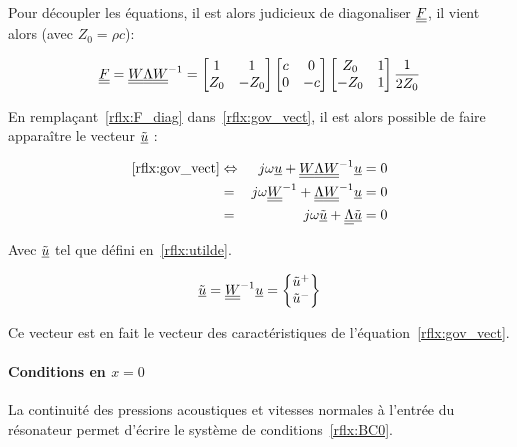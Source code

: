 Pour découpler les équations, il est alors judicieux de diagonaliser $\underline{\underline{F}}$, il vient alors (avec $Z_0= \rho c$):

\begin{equation}
	\underline{\underline{F}} = \underline{\underline{W}}\underline{\underline{\Lambda}}\underline{\underline{W}}^{-1} =
	\begin{bmatrix}
		1 & 1\\
		Z_0 & -Z_0
	\end{bmatrix}
	\begin{bmatrix}
		c & 0\\
		0 & -c
	\end{bmatrix}
	\begin{bmatrix}
		Z_0 & 1\\
		-Z_0 &  1
	\end{bmatrix}\frac{1}{2Z_0} \label{rflx:F_diag}
\end{equation}

En remplaçant~\eqref{rflx:F_diag} dans~\eqref{rflx:gov_vect}, il est alors possible de faire apparaître le vecteur
$\tilde{\underline{u}}$ :

\begin{eqnarray}
	\eqref{rflx:gov_vect} & \Leftrightarrow & j\omega \underline{u} + \underline{\underline{W}}\underline{\underline{\Lambda}}\underline{\underline{W}}^{-1}\underline{u} = 0\notag\\
									    & = & j\omega\underline{\underline{W}}^{-1} + \underline{\underline{\Lambda}}\underline{\underline{W}}^{-1}\underline{u} = 0\notag\\
										& = & j\omega\tilde{\underline{u}} + \underline{\underline{\Lambda}}\tilde{\underline{u}} = 0\label{rflx:gov_utilde}
\end{eqnarray}

Avec $\tilde{\underline{u}}$ tel que défini en~\eqref{rflx:utilde}.

\begin{equation}
	\tilde{\underline{u}} = \underline{\underline{W}}^{-1}\underline{u} = \begin{Bmatrix}\tilde{u}^+\\\tilde{u}^-\end{Bmatrix} \label{rflx:utilde}
\end{equation}

Ce vecteur est en fait le vecteur des caractéristiques de l'équation~\eqref{rflx:gov_vect}.

\paragraph{Conditions en $x=0$}

La continuité des pressions acoustiques et vitesses normales à l'entrée du résonateur permet d'écrire le système de
conditions~\eqref{rflx:BC0}.

